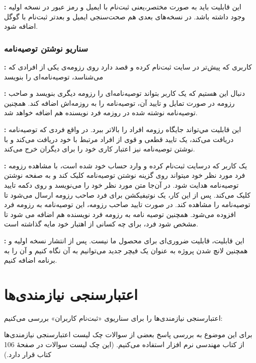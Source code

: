 \documentclass[]{article}
\begin{document}
	\textbf{:} این قابلیت باید به صورت مختصر،‌یعنی ثبت‌نام با ایمیل و رمز عبور در نسخه اولیه وجود داشته باشد. در نسخه‌های بعدی هم صحت‌سنجی ایمیل و بعدتر ثبت‌نام با گوگل اضافه شود.
	
	
	\subsubsection{\Large{سناریو نوشتن توصیه‌نامه}}
	\textbf{:} کاربری که پیش‌تر در سایت ثبت‌نام کرده و قصد دارد روی رزومه‌ی یکی از افرادی که می‌شناسد، توصیه‌نامه‌ای را بنویسد
	
	\textbf{:} دنبال این هستیم که یک کاربر بتواند توصیه‌نامه‌ای را رزومه دیگری بنویسد و صاحب رزومه در صورت تمایل و تایید آن، توصیه‌نامه را به روزمه‌اش اضافه کند. همچنین توصیه‌نامه نوشته شده در روزمه فرد نویسنده هم اضافه خواهد شد.
	
	\textbf{:} این قابلیت مي‌تواند جایگاه رزومه افراد را بالاتر ببرد. در واقع فردی که توصیه‌نامه دریافت می‌کند، یک تایید قطعی و قوی از افراد مرتبط با خود دریافت می‌کند و با نوشتن توصیه‌نامه نیز اعتبار کاری خود را برای دیگران خرج می‌کند.
	
	\textbf{:} یک کاربر که درسایت ثبت‌نام کرده و وارد حساب خود شده است، با مشاهده رزومه فرد مورد نظر خود میتواند  روی گزینه نوشتن توصیه‌نامه کلیک کند و به صفحه نوشتن توصیه‌نامه هدایت شود. در آن‌جا متن مورد نظر خود را می‌نویسد و روی دکمه تایید کلیک می‌کند. پس از این کار، یک نوتیفیکشن برای فرد صاحب رزومه ارسال می‌شود تا توصیه‌نامه را مشاهده کند. در صورت تایید صاحب‌ رزومه، این توصیه‌نامه به رزومه فرد افزوده می‌شود. همچنین توصیه‌ نامه به رزومه فرد نویسنده هم اضافه می شود تا مشخص شود فرد، برای چه کسانی از اهتبار خود مایه گذاشته است.
	
	\textbf{:} این قابلیت، قابلیت ضروری‌ای برای محصول ما نیست. پس از انتشار نسخه‌ اولیه و همچنین لانچ شدن پروژه به عنوان یک فیچر جدید می‌توانیم به آن نگاه کنیم و آن را به برنامه اضافه کنیم.
	
	
	
	\section{\huge{اعتبارسنجی نیازمندی‌ها}}
	
	اعتبارسنجی نیازمندی‌ها را برای سناریوی «ثبت‌نام کاربران» بررسی می‌کنیم:
	
	برای این موضوع به بررسی پاسخ بعضی از سوالات چک لیست اعتبارسنجی نیازمندی‌ها از کتاب مهندسی نرم افزار
	استفاده می‌کنیم. (این چک لیست سوالات در صفحۀ 106 کتاب قرار دارد.) 
	
\end{document}
